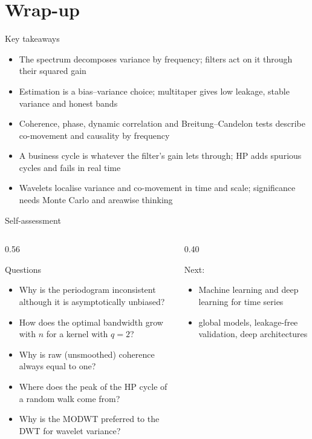\section{Wrap-up}

\begin{frame}{Key takeaways}
\itemsize{\small}
\begin{itemize}
    \item The spectrum decomposes variance by frequency; filters act on it through their squared gain
    \item Estimation is a bias--variance choice; multitaper gives low leakage, stable variance and honest bands
    \item Coherence, phase, dynamic correlation and Breitung--Candelon tests describe co-movement and causality by frequency
    \item A business cycle is whatever the filter's gain lets through; HP adds spurious cycles and fails in real time
    \item Wavelets localise variance and co-movement in time and scale; significance needs Monte Carlo and areawise thinking
\end{itemize}
\end{frame}

\begin{frame}{Self-assessment}
\itemsize{\small}
\begin{columns}[T]
\begin{column}{0.56\textwidth}
\begin{block}{Questions}
\begin{itemize}
    \item Why is the periodogram inconsistent although it is asymptotically unbiased?
    \item How does the optimal bandwidth grow with $n$ for a kernel with $q = 2$?
    \item Why is raw (unsmoothed) coherence always equal to one?
    \item Where does the peak of the HP cycle of a random walk come from?
    \item Why is the MODWT preferred to the DWT for wavelet variance?
\end{itemize}
\end{block}
\end{column}
\begin{column}{0.40\textwidth}
\begin{block}{Next: }
\begin{itemize}
    \item Machine learning and deep learning for time series
    \item global models, leakage-free validation, deep architectures
\end{itemize}
\end{block}
\end{column}
\end{columns}
\end{frame}


